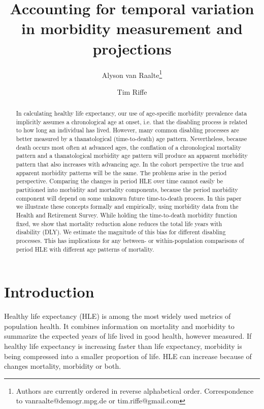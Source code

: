 \documentclass[11pt,oneside,a4paper]{article} %
\begin{document}
\title{Accounting for temporal variation in morbidity measurement
and projections}

\author[1]{Alyson van Raalte\thanks{Authors are currently ordered in reverse alphabetical order. Correspondence to vanraalte@demogr.mpg.de or tim.riffe@gmail.com}}
\author[1]{Tim Riffe}


\maketitle

\begin{abstract}
In calculating healthy life expectancy, our use of age-specific morbidity prevalence data implicitly assumes a chronological age at onset, i.e. that the disabling process is related to how long an individual has lived. However, many common disabling processes are better measured by a thanatological (time-to-death) age pattern. Nevertheless, because death occurs most often at advanced ages, the conflation of a chronological mortality pattern and a thanatological morbidity age pattern will produce an apparent morbidity pattern that also increases with advancing age. In the cohort perspective the true and apparent morbidity patterns will be the same. The problems arise in the period perspective. Comparing the changes in period HLE over time cannot easily be partitioned into morbidity and mortality components, because the period morbidity component will depend on some unknown future time-to-death process. In this paper we illustrate these concepts formally and empirically, using morbidity data from the Health and Retirement Survey. While holding the time-to-death morbidity function fixed, we show that mortality reduction alone reduces the total life years with disability (DLY). We estimate the magnitude of this bias for different disabling processes. This has implications for any between- or within-population comparisons of period HLE with different age patterns of mortality. 
\end{abstract}

\newpage
\section{Introduction}

Healthy life expectancy (HLE) is among the most widely used metrics of population health. It combines information on mortality and morbidity to summarize the expected years of life lived in good health, however measured. If healthy life expectancy is increasing faster than life expectancy, morbidity is being compressed into a smaller proportion of life. HLE can increase because of changes mortality, morbidity or both. 
\end{document}
